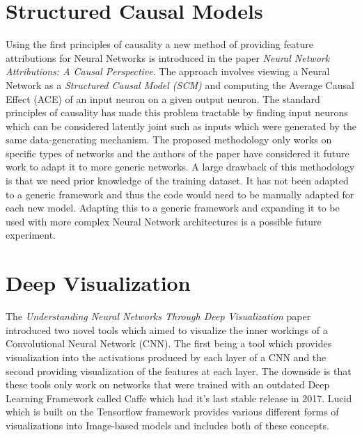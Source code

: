 \section{Structured Causal Models}
 Using the first principles of causality \cite{10.5555/1642718} \cite{DBLP:journals/corr/abs-1210-4852} a new method of providing feature attributions for Neural Networks is introduced in the paper \emph{Neural Network Attributions: A Causal Perspective}\cite{DBLP:journals/corr/abs-1902-02302}. The approach involves viewing a Neural Network as a \emph{Structured Causal Model (SCM)} \cite{10.5555/1642718} and computing the Average Causal Effect (ACE) \cite{rubin1978} of an input neuron on a given output neuron. The standard principles of causality has made this problem tractable by finding input neurons which can be considered latently joint such as inputs which were generated by the same data-generating mechanism. The proposed methodology only works on specific types of networks and the authors of the paper have considered it future work to adapt it to more generic networks. A large drawback of this methodology is that we need prior knowledge of the training dataset. It has not been adapted to a generic framework and thus the code would need to be manually adapted for each new model. Adapting this to a generic framework and expanding it to be used with more complex Neural Network architectures is a possible future experiment.

\section{Deep Visualization}
The \emph{Understanding Neural Networks Through Deep Visualization} \cite{DBLP:journals/corr/YosinskiCNFL15} paper introduced two novel tools which aimed to visualize the inner workings of a  Convolutional Neural Network (CNN). The first being a tool which provides visualization into the activations produced  by  each  layer  of a CNN and the second providing visualization of the features at each layer. The downside is that these tools only work on networks that were trained with an outdated Deep Learning Framework called Caffe \cite{jia2014caffe} which had it's last stable release in 2017. Lucid which is built on the Tensorflow framework provides various different forms of visualizations into Image-based models and includes both of these concepts.
